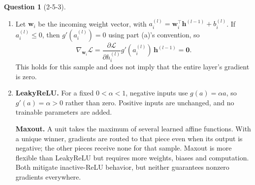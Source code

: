 \documentclass[12pt]{article}
\theoremstyle{definition}
\newtheorem{exercise}{Question}%
\newcommand{\pd}[2]{\dfrac{\partial #1}{\partial #2}}
\newcommand{\vect}[1]{\bm{#1}}
\begin{document}
\begin{exercise}[2-5-3]
{\begin{enumerate}[label=\textbf{(\arabic*)}, leftmargin=*]
\begin{enumerate}[label=\textbf{(\alph*)}, leftmargin=*]
        \item Let $\vect{w}_i$ be the incoming weight vector, with
        $a_i^{(l)}=\vect{w}_i^\top\vect{h}^{(l-1)}+b_i^{(l)}$.
        If $a_i^{(l)}\leq0$, then $g'(a_i^{(l)})=0$ using part (a)'s
        convention, so
        \[
            \nabla_{\vect{w}_i}\mathcal L
            =\pd{\mathcal L}{h_i^{(l)}}g'(a_i^{(l)})\,\vect{h}^{(l-1)}
            =\boxed{\vect{0}}.
        \]
        This holds for this sample and does not imply that the entire
        layer's gradient is zero.

        \item \textbf{LeakyReLU.} For a fixed $0<\alpha<1$, negative inputs
        use $g(a)=\alpha a$, so $g'(a)=\alpha>0$ rather than zero. Positive
        inputs are unchanged, and no trainable parameters are added.

        \textbf{Maxout.} A unit takes the maximum of several learned affine
        functions. With a unique winner, gradients are routed to that piece
        even when its output is negative; the other pieces receive none for
        that sample. Maxout is more flexible than LeakyReLU but requires more
        weights, biases and computation. Both mitigate inactive-ReLU behavior,
        but neither guarantees nonzero gradients everywhere.
    \end{enumerate}
\end{enumerate}
}

\end{exercise}
\end{document}
